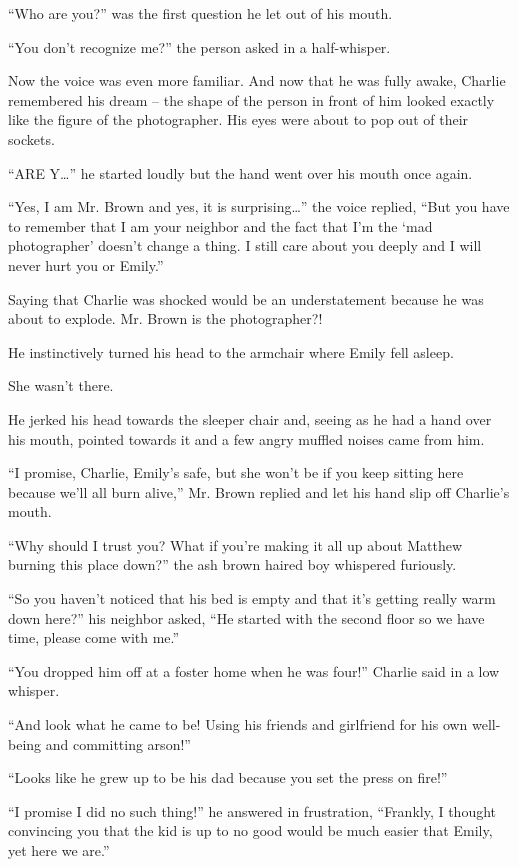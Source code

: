 “Who are you?” was the first question he let out of his mouth.

“You don't recognize me?” the person asked in a half-whisper.

Now the voice was even more familiar. And now that he was fully awake, Charlie remembered his dream – the shape of the person in front of him looked exactly like the figure of the photographer. His eyes were about to pop out of their sockets.

“ARE Y…” he started loudly but the hand went over his mouth once again.

“Yes, I am Mr. Brown and yes, it is surprising…” the voice replied, “But you have to remember that I am your neighbor and the fact that I'm the ‘mad photographer' doesn't change a thing. I still care about you deeply and I will never hurt you or Emily.”

Saying that Charlie was shocked would be an understatement because he was about to explode. Mr. Brown is the photographer?!

He instinctively turned his head to the armchair where Emily fell asleep.

She wasn't there.

He jerked his head towards the sleeper chair and, seeing as he had a hand over his mouth, pointed towards it and a few angry muffled noises came from him.

“I promise, Charlie, Emily's safe, but she won't be if you keep sitting here because we'll all burn alive,” Mr. Brown replied and let his hand slip off Charlie's mouth.

“Why should I trust you? What if you're making it all up about Matthew burning this place down?” the ash brown haired boy whispered furiously.

“So you haven't noticed that his bed is empty and that it's getting really warm down here?” his neighbor asked, “He started with the second floor so we have time, please come with me.”

“You dropped him off at a foster home when he was four!” Charlie said in a low whisper.

“And look what he came to be! Using his friends and girlfriend for his own well-being and committing arson!”

“Looks like he grew up to be his dad because you set the press on fire!”

“I promise I did no such thing!” he answered in frustration, “Frankly, I thought convincing you that the kid is up to no good would be much easier that Emily, yet here we are.”

